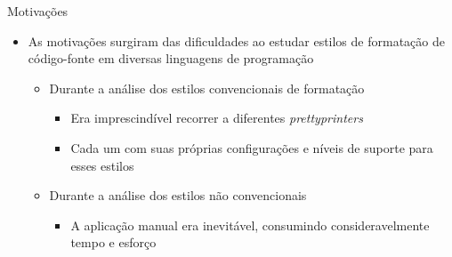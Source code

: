 \documentclass
  [ aspectratio=169,
    english,
    hyperref={citecolor=blue,colorlinks=true,linkcolor=blue,urlcolor=blue},
    brazil]
  {beamer}
\title{\worktitle}
\subtitle{\worksubtitle}
\author{Átila Gama Silva}
\date{\today}
\begin{document}


  \newlength{\halftextwidthplustwoempart}
  \setlength{\halftextwidthplustwoempart}{.5\textwidth + 2em}
  \newlength{\halftextwidthplustwoemcounterpart}
  \setlength{\halftextwidthplustwoemcounterpart}{.5\textwidth - 3em}


  \newlength{\halftextwidthplusfiveempart}
  \setlength{\halftextwidthplusfiveempart}{.5\textwidth + 5em}
  \newlength{\halftextwidthplusfiveemcounterpart}
  \setlength{\halftextwidthplusfiveemcounterpart}{.5\textwidth - 6em}


  \begin{frame}\titlepage\end{frame}


  \begin{frame}{Motivações}
    \begin{itemize}
      \item As motivações surgiram das dificuldades ao estudar estilos de
            formatação de código-fonte em diversas linguagens de programação
            \begin{itemize}
              \item Durante a análise dos estilos convencionais de formatação
                    \begin{itemize}
                      \item Era imprescindível recorrer a diferentes
                            \textit{prettyprinters}
                      \item Cada um com suas próprias configurações e níveis de
                            suporte para esses estilos
                    \end{itemize}
              \item Durante a análise dos estilos não convencionais
                    \begin{itemize}
                      \item A aplicação manual era inevitável, consumindo
                            consideravelmente tempo e esforço
                    \end{itemize}
            \end{itemize}
    \end{itemize}
  \end{frame}
\end{document}
